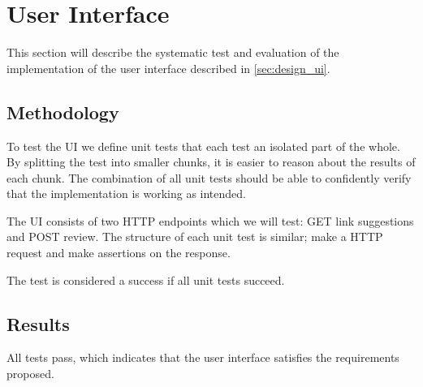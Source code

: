 \section{User Interface}
This section will describe the systematic test and evaluation of the implementation of the user interface described in \cref{sec:design_ui}.

\subsection{Methodology}
To test the UI we define unit tests that each test an isolated part of the whole. By splitting the test into smaller chunks, it is easier to reason about the results of each chunk. The combination of all unit tests should be able to confidently verify that the implementation is working as intended.

The UI consists of two HTTP endpoints which we will test: GET link suggestions and POST review. The structure of each unit test is similar; make a HTTP request and make assertions on the response. 

The test is considered a success if all unit tests succeed.

\subsection{Results}
All tests pass, which indicates that the user interface satisfies the requirements proposed.  
